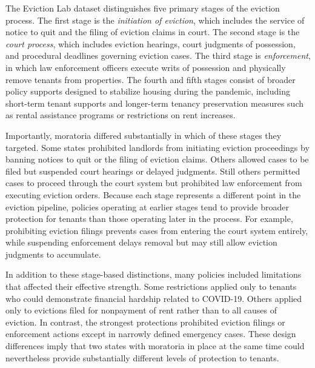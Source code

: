 \documentclass[12pt]{article}
\begin{document}
The Eviction Lab dataset distinguishes five primary stages of the eviction process. The first stage is the \textit{initiation of eviction}, which includes the service of notice to quit and the filing of eviction claims in court. The second stage is the \textit{court process}, which includes eviction hearings, court judgments of possession, and procedural deadlines governing eviction cases. The third stage is \textit{enforcement}, in which law enforcement officers execute writs of possession and physically remove tenants from properties. The fourth and fifth stages consist of broader policy supports designed to stabilize housing during the pandemic, including short-term tenant supports and longer-term tenancy preservation measures such as rental assistance programs or restrictions on rent increases.

Importantly, moratoria differed substantially in which of these stages they targeted. Some states prohibited landlords from initiating eviction proceedings by banning notices to quit or the filing of eviction claims. Others allowed cases to be filed but suspended court hearings or delayed judgments. Still others permitted cases to proceed through the court system but prohibited law enforcement from executing eviction orders. Because each stage represents a different point in the eviction pipeline, policies operating at earlier stages tend to provide broader protection for tenants than those operating later in the process. For example, prohibiting eviction filings prevents cases from entering the court system entirely, while suspending enforcement delays removal but may still allow eviction judgments to accumulate.

In addition to these stage-based distinctions, many policies included limitations that affected their effective strength. Some restrictions applied only to tenants who could demonstrate financial hardship related to COVID-19. Others applied only to evictions filed for nonpayment of rent rather than to all causes of eviction. In contrast, the strongest protections prohibited eviction filings or enforcement actions except in narrowly defined emergency cases. These design differences imply that two states with moratoria in place at the same time could nevertheless provide substantially different levels of protection to tenants.
\end{document}
